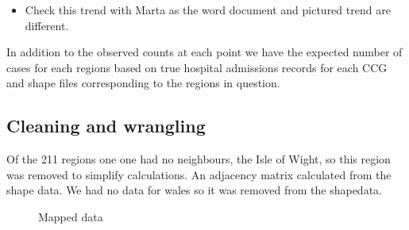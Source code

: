 \documentclass{article}
\begin{document}
\begin{itemize}
\item Check this trend with Marta as the word document and pictured trend are different.
\end{itemize}

In addition to the observed counts at each point we have the expected number of cases for each regions based on true hospital admissions records for each CCG and shape files corresponding to the regions in question.

\subsection{Cleaning and wrangling}

Of the 211 regions one one had no neighbours, the Isle of Wight, so this region was removed to simplify calculations. An adjacency matrix calculated from the shape data. We had no data for wales so it was removed from the shapedata.

\begin{figure}
\centering
{}
\caption{Mapped data}
\end{figure}
\end{document}
